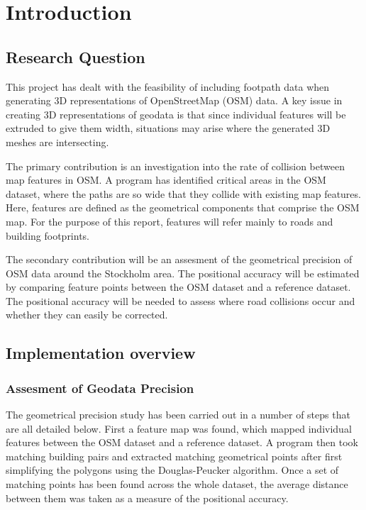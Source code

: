 \documentclass[a4paper]{article}
\begin{document}

\section{Introduction}

\subsection{Research Question}

This project has dealt with the feasibility of including footpath data when generating 3D representations of OpenStreetMap (OSM) data.
A key issue in creating 3D representations of geodata is that since individual features will be extruded to give them width, situations may arise where the generated 3D meshes are intersecting.

The primary contribution is an investigation into the rate of collision between map features in OSM.
A program has identified critical areas in the OSM dataset, where the paths are so wide that they collide with existing map features.
Here, features are defined as the geometrical components that comprise the OSM map.
For the purpose of this report, features will refer mainly to roads and building footprints.

The secondary contribution will be an assesment of the geometrical precision of OSM data around the Stockholm area.
The positional accuracy will be estimated by comparing feature points between the OSM dataset and a reference dataset.
The positional accuracy will be needed to assess where road collisions occur and whether they can easily be corrected.

\subsection{Implementation overview}

\subsubsection{Assesment of Geodata Precision}

The geometrical precision study has been carried out in a number of steps that are all detailed below.
First a feature map was found, which mapped individual features between the OSM dataset and a reference dataset.
A program then took matching building pairs and extracted matching geometrical points after first simplifying the polygons using the Douglas-Peucker algorithm.
Once a set of matching points has been found across the whole dataset, the average distance between them was taken as a measure of the positional accuracy.
\end{document}
